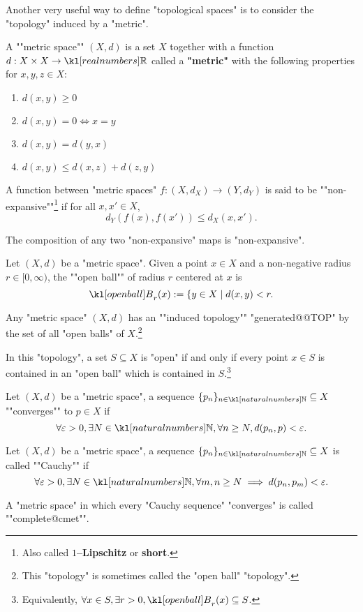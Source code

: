 \documentclass[main.tex]{subfiles}
\begin{document}
Another very useful way to define "topological spaces" is to consider the "topology" induced by a "metric".
\begin{defn}
	\AP A ""metric space"" $(X,d)$ is a set $X$ together with a function $d: X \times X \rightarrow \R$ called a \textbf{"metric"} with the following properties for $x,y,z \in X$:
	\begin{enumerate}
		\item $d(x,y) \geq 0$
		\item $d(x,y) = 0 \Leftrightarrow x = y$
		\item $d(x,y) = d(y,x)$
		\item $d(x,y) \leq d(x,z) + d(z,y)$
	\end{enumerate}
\end{defn}
\begin{defn}
	\AP A function between "metric spaces" $f: (X,d_X) \rightarrow (Y, d_Y)$ is said to be ""non-expansive""\footnote{Also called \textbf{$1$--Lipschitz} or \textbf{short}.} if for all $x, x' \in X$, \[d_Y(f(x),f(x')) \leq d_X(x,x').\]
\end{defn}
\begin{prop}
	The composition of any two "non-expansive" maps is "non-expansive".
\end{prop}
\begin{defn}
	\AP Let $(X,d)$ be a "metric space". Given a point $x \in X$ and a non-negative radius $r\in [0,\infty)$, the ""open ball"" of radius $r$ centered at $x$ is
	\[\ball_r(x) := \{y \in X \mid d(x,y) < r.\]
\end{defn}
\begin{defn}
	\AP Any "metric space" $(X,d)$ has an ""induced topology"" "generated@@TOP" by the set of all "open balls" of $X$.\footnote{This "topology" is sometimes called the "open ball" "topology".}

	In this "topology", a set $S \subseteq X$ is "open" if and only if every point $x \in S$ is contained in an "open ball" which is contained in $S$.\footnote{Equivalently, $\forall x \in S, \exists r>0, \ball_r(x)\subseteq S$.}
\end{defn}

\begin{defn}[Convergence]
	\AP Let $(X,d)$ be a "metric space", a sequence $\{p_n\}_{n \in \N} \subseteq X$ ""converges"" to $p \in X$ if \[\forall \varepsilon > 0, \exists N \in \N, \forall n \geq N, d(p_n,p) < \varepsilon.\]
\end{defn}
\begin{defn}
	\AP Let $(X,d)$ be a "metric space", a sequence $\{p_n\}_{n \in \N} \subseteq X$  is called ""Cauchy"" if \[\forall \varepsilon > 0, \exists N \in \N, \forall m,n \geq N \implies d(p_n,p_m) < \varepsilon.\]
\end{defn}
\begin{defn}[Completeness]
	\AP A "metric space" in which every "Cauchy sequence" "converges" is called ""complete@cmet"".
\end{defn}
\end{document}
